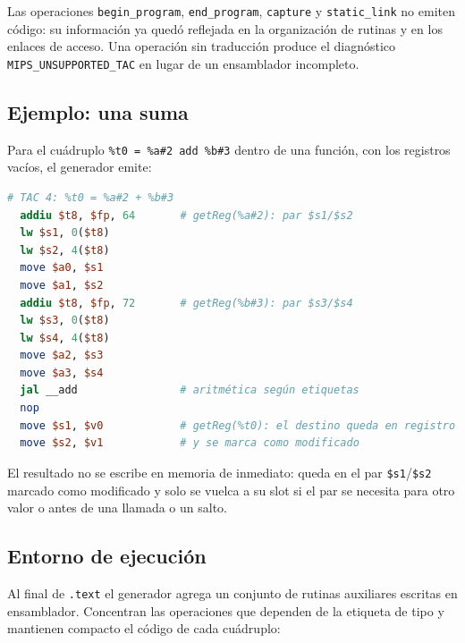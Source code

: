 \documentclass[11pt,a4paper]{article}
\begin{document}
Las operaciones \texttt{begin\_program}, \texttt{end\_program},
\texttt{capture} y \texttt{static\_link} no emiten código: su información ya
quedó reflejada en la organización de rutinas y en los enlaces de acceso. Una
operación sin traducción produce el diagnóstico
\texttt{MIPS\_UNSUPPORTED\_TAC} en lugar de un ensamblador incompleto.

\subsection{Ejemplo: una suma}

Para el cuádruplo \texttt{\%t0 = \%a\#2 add \%b\#3} dentro de una función, con
los registros vacíos, el generador emite:

\begin{lstlisting}[language=MIPS,caption={Traducción de una suma (offsets ilustrativos).}]
  # TAC 4: %t0 = %a#2 + %b#3
  addiu $t8, $fp, 64       # getReg(%a#2): par $s1/$s2
  lw $s1, 0($t8)
  lw $s2, 4($t8)
  move $a0, $s1
  move $a1, $s2
  addiu $t8, $fp, 72       # getReg(%b#3): par $s3/$s4
  lw $s3, 0($t8)
  lw $s4, 4($t8)
  move $a2, $s3
  move $a3, $s4
  jal __add                # aritmética según etiquetas
  nop
  move $s1, $v0            # getReg(%t0): el destino queda en registro
  move $s2, $v1            # y se marca como modificado
\end{lstlisting}

El resultado no se escribe en memoria de inmediato: queda en el par
\texttt{\$s1}/\texttt{\$s2} marcado como modificado y solo se vuelca a su slot
si el par se necesita para otro valor o antes de una llamada o un salto.

\subsection{Entorno de ejecución}

Al final de \texttt{.text} el generador agrega un conjunto de rutinas auxiliares
escritas en ensamblador. Concentran las operaciones que dependen de la
etiqueta de tipo y mantienen compacto el código de cada cuádruplo:
\end{document}
